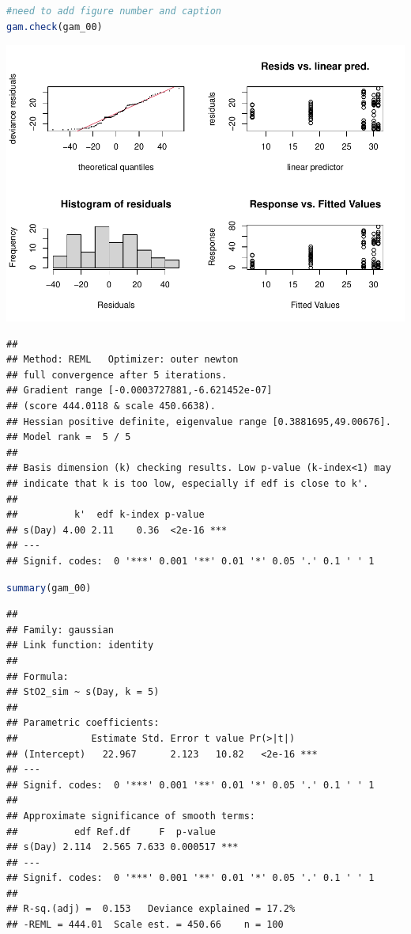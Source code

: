 \documentclass[
]{article}
\begin{document}
\begin{lstlisting}[language=R]
#need to add figure number and caption
gam.check(gam_00)
\end{lstlisting}

\includegraphics{00-Full_document_files/figure-latex/first-GAM-check-1}

\begin{lstlisting}
## 
## Method: REML   Optimizer: outer newton
## full convergence after 5 iterations.
## Gradient range [-0.0003727881,-6.621452e-07]
## (score 444.0118 & scale 450.6638).
## Hessian positive definite, eigenvalue range [0.3881695,49.00676].
## Model rank =  5 / 5 
## 
## Basis dimension (k) checking results. Low p-value (k-index<1) may
## indicate that k is too low, especially if edf is close to k'.
## 
##          k'  edf k-index p-value    
## s(Day) 4.00 2.11    0.36  <2e-16 ***
## ---
## Signif. codes:  0 '***' 0.001 '**' 0.01 '*' 0.05 '.' 0.1 ' ' 1
\end{lstlisting}

\begin{lstlisting}[language=R]
summary(gam_00)
\end{lstlisting}

\begin{lstlisting}
## 
## Family: gaussian 
## Link function: identity 
## 
## Formula:
## StO2_sim ~ s(Day, k = 5)
## 
## Parametric coefficients:
##             Estimate Std. Error t value Pr(>|t|)    
## (Intercept)   22.967      2.123   10.82   <2e-16 ***
## ---
## Signif. codes:  0 '***' 0.001 '**' 0.01 '*' 0.05 '.' 0.1 ' ' 1
## 
## Approximate significance of smooth terms:
##          edf Ref.df     F  p-value    
## s(Day) 2.114  2.565 7.633 0.000517 ***
## ---
## Signif. codes:  0 '***' 0.001 '**' 0.01 '*' 0.05 '.' 0.1 ' ' 1
## 
## R-sq.(adj) =  0.153   Deviance explained = 17.2%
## -REML = 444.01  Scale est. = 450.66    n = 100
\end{lstlisting}
\end{document}
